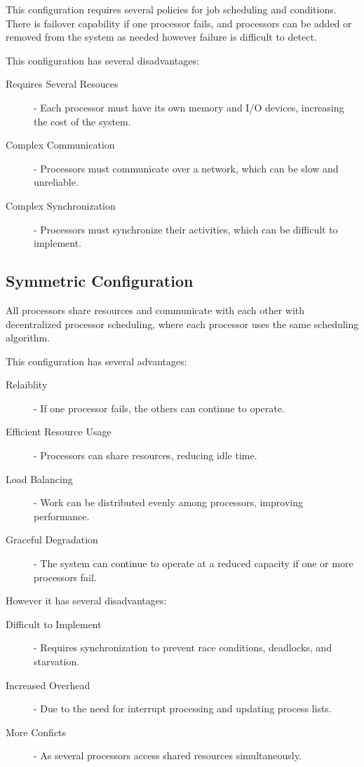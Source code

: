 \documentclass[12pt letter]{report}
\begin{document}
This configuration requires several policies for job scheduling and
conditions. There is failover capability if one processor fails, and
processors can be added or removed
from the system as needed however failure is difficult to detect.

This configuration has several disadvantages:
\begin{description}
  \item[Requires Several Resouces] - Each processor must have its own memory
    and I/O devices, increasing the cost of the system.
  \item[Complex Communication] - Processors must communicate over a
    network, which can be slow and unreliable.
  \item[Complex Synchronization] - Processors must synchronize their
    activities, which can be difficult to implement.
\end{description}

\subsection{Symmetric Configuration}

All processors share resources and communicate with each other with
decentralized processor scheduling, where each processor uses the
same scheduling algorithm.

This configuration has several advantages:
\begin{description}
  \item[Relaiblity] -  If one processor fails, the others can continue
    to operate.
  \item[Efficient Resource Usage] - Processors can share resources,
    reducing idle time.
  \item[Load Balancing] - Work can be distributed evenly among processors,
    improving performance.
  \item[Graceful Degradation] - The system can continue to operate at a reduced
    capacity if one or more processors fail.
\end{description}

However it has several disadvantages:
\begin{description}
  \item[Difficult to Implement]  - Requires synchronization to
    prevent race conditions, deadlocks, and starvation.
  \item[Increased Overhead] - Due to the need for interrupt
    processing and updating process lists.
  \item[More Conficts] - As several processors access shared resources
    simultaneously.
\end{description}
\end{document}
